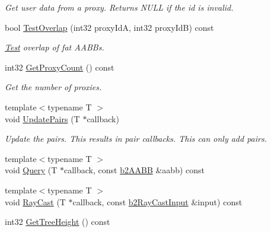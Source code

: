 \begin{DoxyCompactItemize}
\begin{DoxyCompactList}\small\item\em Get user data from a proxy. Returns N\-U\-L\-L if the id is invalid. \end{DoxyCompactList}\item 
\hypertarget{classb2_broad_phase_a1785eb29d14997d81bd537f064d22aba}{bool \hyperlink{classb2_broad_phase_a1785eb29d14997d81bd537f064d22aba}{Test\-Overlap} (int32 proxy\-Id\-A, int32 proxy\-Id\-B) const }\label{classb2_broad_phase_a1785eb29d14997d81bd537f064d22aba}

\begin{DoxyCompactList}\small\item\em \hyperlink{class_test}{Test} overlap of fat A\-A\-B\-Bs. \end{DoxyCompactList}\item 
\hypertarget{classb2_broad_phase_a399fa4f5289a1ec46a65f726f3bac890}{int32 \hyperlink{classb2_broad_phase_a399fa4f5289a1ec46a65f726f3bac890}{Get\-Proxy\-Count} () const }\label{classb2_broad_phase_a399fa4f5289a1ec46a65f726f3bac890}

\begin{DoxyCompactList}\small\item\em Get the number of proxies. \end{DoxyCompactList}\item 
\hypertarget{classb2_broad_phase_a0a1acd693466b997700242ae00784c20}{{\footnotesize template$<$typename T $>$ }\\void \hyperlink{classb2_broad_phase_a0a1acd693466b997700242ae00784c20}{Update\-Pairs} (T $\ast$callback)}\label{classb2_broad_phase_a0a1acd693466b997700242ae00784c20}

\begin{DoxyCompactList}\small\item\em Update the pairs. This results in pair callbacks. This can only add pairs. \end{DoxyCompactList}\item 
{\footnotesize template$<$typename T $>$ }\\void \hyperlink{classb2_broad_phase_aea5732362c8bb3959c6b24f967654d93}{Query} (T $\ast$callback, const \hyperlink{structb2_a_a_b_b}{b2\-A\-A\-B\-B} \&aabb) const 
\item 
{\footnotesize template$<$typename T $>$ }\\void \hyperlink{classb2_broad_phase_aebcb837120ce45bbb82b4b61db533026}{Ray\-Cast} (T $\ast$callback, const \hyperlink{structb2_ray_cast_input}{b2\-Ray\-Cast\-Input} \&input) const 
\item 
\hypertarget{classb2_broad_phase_aeb9f94f44840c5bd766031d78f63ca08}{int32 \hyperlink{classb2_broad_phase_aeb9f94f44840c5bd766031d78f63ca08}{Get\-Tree\-Height} () const }\label{classb2_broad_phase_aeb9f94f44840c5bd766031d78f63ca08}


\end{DoxyCompactItemize}
